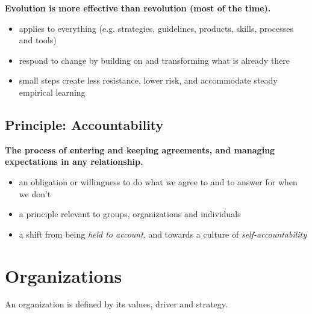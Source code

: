 \textbf{Evolution is more effective than revolution (most of the time).}

\begin{itemize}
\item applies to everything (e.g. strategies, guidelines, products, skills, processes and tools)

\item respond to change by building on and transforming what is already there

\item small steps create less resistance, lower risk, and accommodate steady empirical learning

\end{itemize}

\subsection{Principle: Accountability}
\label{principle:accountability}

\textbf{The process of entering and keeping agreements, and managing expectations in any relationship.}

\begin{itemize}
\item an obligation or willingness to do what we agree to and to answer for when we don’t

\item a principle relevant to groups, organizations and individuals

\item a shift from being \emph{held to account}, and towards a culture of \emph{self-accountability}

\end{itemize}

\section{Organizations}
\label{organizations}

An organization is defined by its values, driver and strategy.

